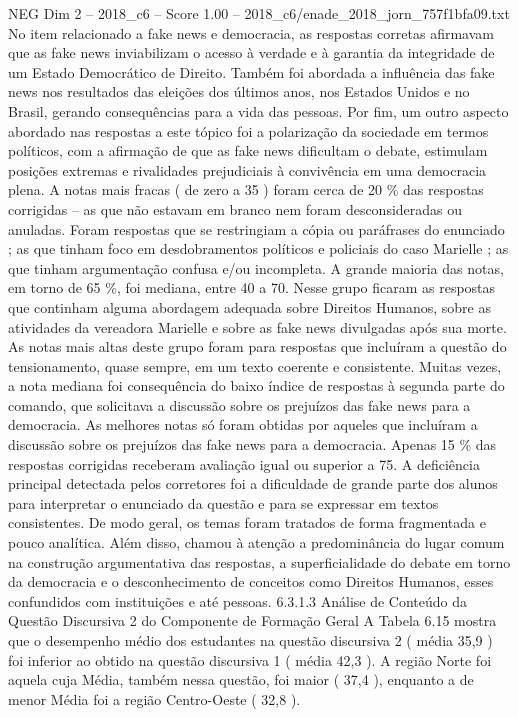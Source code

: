 \begin{textsample}{NEG Dim 2 – 2018\_c6 – Score 1.00 – 2018\_c6/enade\_2018\_jorn\_757f1bfa09.txt}
No item relacionado a fake news e democracia, as respostas corretas afirmavam que as fake news inviabilizam o acesso à verdade e à garantia da integridade de um Estado Democrático de Direito.
Também foi abordada a influência das fake news nos resultados das eleições dos últimos anos, nos Estados Unidos e no Brasil, gerando consequências para a vida das pessoas.
Por fim, um outro aspecto abordado nas respostas a este tópico foi a polarização da sociedade em termos políticos, com a afirmação de que as fake news dificultam o debate, estimulam posições extremas e rivalidades prejudiciais à convivência em uma democracia plena.
A notas mais fracas ( de zero a 35 ) foram cerca de 20 \% das respostas corrigidas – as que não estavam em branco nem foram desconsideradas ou anuladas.
Foram respostas que se restringiam a cópia ou paráfrases do enunciado ; as que tinham foco em desdobramentos políticos e policiais do caso Marielle ; as que tinham argumentação confusa e/ou incompleta.
A grande maioria das notas, em torno de 65 \%, foi mediana, entre 40 a 70.
Nesse grupo ficaram as respostas que continham alguma abordagem adequada sobre Direitos Humanos, sobre as atividades da vereadora Marielle e sobre as fake news divulgadas após sua morte.
As notas mais altas deste grupo foram para respostas que incluíram a questão do tensionamento, quase sempre, em um texto coerente e consistente.
Muitas vezes, a nota mediana foi consequência do baixo índice de respostas à segunda parte do comando, que solicitava a discussão sobre os prejuízos das fake news para a democracia.
As melhores notas só foram obtidas por aqueles que incluíram a discussão sobre os prejuízos das fake news para a democracia.
Apenas 15 \% das respostas corrigidas receberam avaliação igual ou superior a 75.
A deficiência principal detectada pelos corretores foi a dificuldade de grande parte dos alunos para interpretar o enunciado da questão e para se expressar em textos consistentes.
De modo geral, os temas foram tratados de forma fragmentada e pouco analítica.
Além disso, chamou à atenção a predominância do lugar comum na construção argumentativa das respostas, a superficialidade do debate em torno da democracia e o desconhecimento de conceitos como Direitos Humanos, esses confundidos com instituições e até pessoas. 6.3.1.3 Análise de Conteúdo da Questão Discursiva 2 do Componente de Formação Geral A Tabela 6.15 mostra que o desempenho médio dos estudantes na questão discursiva 2 ( média 35,9 ) foi inferior ao obtido na questão discursiva 1 ( média 42,3 ).
A região Norte foi aquela cuja Média, também nessa questão, foi maior ( 37,4 ), enquanto a de menor Média foi a região Centro-Oeste ( 32,8 ).

\end{textsample}
